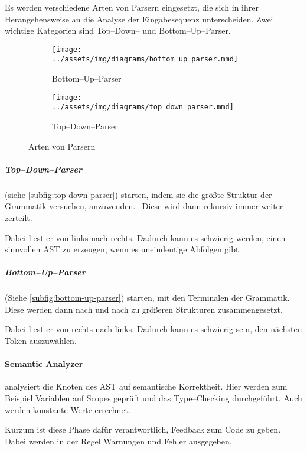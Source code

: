 Es werden verschiedene Arten von Parsern eingesetzt, die sich in ihrer Herangehensweise an die Analyse der Eingabesequenz unterscheiden.
Zwei wichtige Kategorien sind Top--Down-- und Bottom--Up--Parser.
\begin{figure}[ht]
    \begin{subfigure}[c]{0.5\textwidth}
        \begin{center}
            \texttt{[image: ../assets/img/diagrams/bottom\_up\_parser.mmd]}
        \end{center}
        \caption{Bottom--Up--Parser}
        \label{subfig:bottom-up-parser}
    \end{subfigure}
    \begin{subfigure}[c]{0.5\textwidth}
        \begin{center}
            \texttt{[image: ../assets/img/diagrams/top\_down\_parser.mmd]}
        \end{center}
        \caption{Top--Down--Parser}
        \label{subfig:top-down-parser}
    \end{subfigure}
    \caption{Arten von Parsern}
    \label{fig:parser-types}
\end{figure}

\subparagraph{Top--Down--Parser} (siehe \autoref{subfig:top-down-parser}) starten, indem sie die größte Struktur der Grammatik versuchen, anzuwenden.~\autocite{geeksforgeeks-2021A}
Diese wird dann rekursiv immer weiter zerteilt.

Dabei liest er von links nach rechts.
Dadurch kann es schwierig werden, einen sinnvollen \ac{AST} zu erzeugen, wenn es uneindeutige Abfolgen gibt.

\subparagraph{Bottom--Up--Parser} (Siehe \autoref{subfig:bottom-up-parser}) starten, mit den Terminalen der Grammatik.~\autocite{geeksforgeeks-2021B}
Diese werden dann nach und nach zu größeren Strukturen zusammengesetzt.

Dabei liest er von rechts nach links.
Dadurch kann es schwierig sein, den nächsten Token auszuwählen.

\paragraph{Semantic Analyzer} analysiert die Knoten des \ac{AST} auf semantische Korrektheit.
Hier werden zum Beispiel Variablen auf Scopes geprüft und das Type--Checking durchgeführt.
Auch werden konstante Werte errechnet.~\autocite{aho-2006}

Kurzum ist diese Phase dafür verantwortlich, Feedback zum Code zu geben.
Dabei werden in der Regel Warnungen und Fehler ausgegeben.

